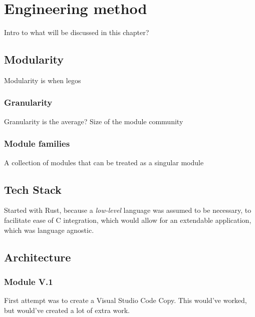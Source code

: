 \chapter{Engineering method}

Intro to what will be discussed in this chapter?

\section{Modularity}

Modularity is when legos

\subsection{Granularity}

Granularity is the average? Size of the module community

\subsection{Module families}

A collection of modules that can be treated as a singular module

\section{Tech Stack}

Started with Rust, because a \textit{low-level} language was assumed to be
necessary, to facilitate ease of C integration, which would allow for an
extendable application, which was language agnostic.

\section{Architecture}


\subsection{Module V.1}


First attempt was to create a Visual Studio Code Copy. This would've worked, but
would've created a lot of extra work.


